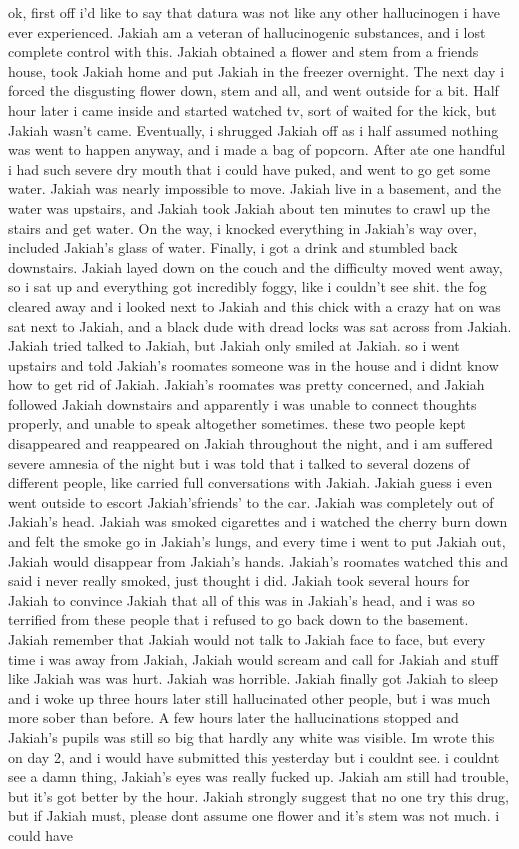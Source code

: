 \documentclass[12pt]{book}
\begin{document}
ok, first off i'd like to say that datura was not like any other hallucinogen i have ever experienced. Jakiah am a veteran of hallucinogenic substances, and i lost complete control with this. Jakiah obtained a flower and stem from a friends house, took Jakiah home and put Jakiah in the freezer overnight. The next day i forced the disgusting flower down, stem and all, and went outside for a bit. Half hour later i came inside and started watched tv, sort of waited for the kick, but Jakiah wasn't came. Eventually, i shrugged Jakiah off as i half assumed nothing was went to happen anyway, and i made a bag of popcorn. After ate one handful i had such severe dry mouth that i could have puked, and went to go get some water. Jakiah was nearly impossible to move. Jakiah live in a basement, and the water was upstairs, and Jakiah took Jakiah about ten minutes to crawl up the stairs and get water. On the way, i knocked everything in Jakiah's way over, included Jakiah's glass of water. Finally, i got a drink and stumbled back downstairs. Jakiah layed down on the couch and the difficulty moved went away, so i sat up and everything got incredibly foggy, like i couldn't see shit. the fog cleared away and i looked next to Jakiah and this chick with a crazy hat on was sat next to Jakiah, and a black dude with dread locks was sat across from Jakiah. Jakiah tried talked to Jakiah, but Jakiah only smiled at Jakiah. so i went upstairs and told Jakiah's roomates someone was in the house and i didnt know how to get rid of Jakiah. Jakiah's roomates was pretty concerned, and Jakiah followed Jakiah downstairs and apparently i was unable to connect thoughts properly, and unable to speak altogether sometimes. these two people kept disappeared and reappeared on Jakiah throughout the night, and i am suffered severe amnesia of the night but i was told that i talked to several dozens of different people, like carried full conversations with Jakiah. Jakiah guess i even went outside to escort Jakiah'sfriends' to the car. Jakiah was completely out of Jakiah's head. Jakiah was smoked cigarettes and i watched the cherry burn down and felt the smoke go in Jakiah's lungs, and every time i went to put Jakiah out, Jakiah would disappear from Jakiah's hands. Jakiah's roomates watched this and said i never really smoked, just thought i did. Jakiah took several hours for Jakiah to convince Jakiah that all of this was in Jakiah's head, and i was so terrified from these people that i refused to go back down to the basement. Jakiah remember that Jakiah would not talk to Jakiah face to face, but every time i was away from Jakiah, Jakiah would scream and call for Jakiah and stuff like Jakiah was was hurt. Jakiah was horrible. Jakiah finally got Jakiah to sleep and i woke up three hours later still hallucinated other people, but i was much more sober than before. A few hours later the hallucinations stopped and Jakiah's pupils was still so big that hardly any white was visible. Im wrote this on day 2, and i would have submitted this yesterday but i couldnt see. i couldnt see a damn thing, Jakiah's eyes was really fucked up. Jakiah am still had trouble, but it's got better by the hour. Jakiah strongly suggest that no one try this drug, but if Jakiah must, please dont assume one flower and it's stem was not much. i could have 
\end{document}
